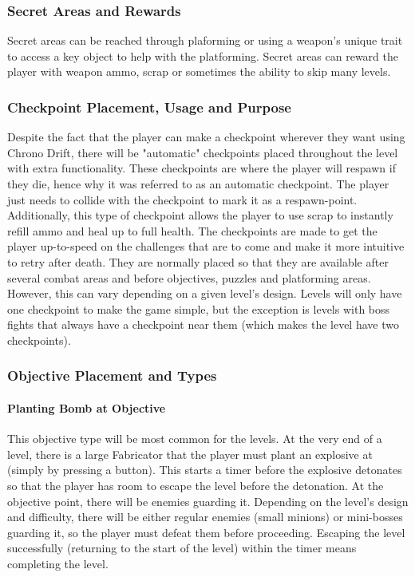 \documentclass[12pt]{article}
\begin{document}
\subsubsection{Secret Areas and Rewards}

Secret areas can be reached through plaforming or using a weapon's unique trait to access a key object to help with the platforming. Secret areas can reward the player with weapon ammo, scrap or sometimes the ability to skip many levels. 


\subsubsection{Checkpoint Placement, Usage and Purpose}

Despite the fact that the player can make a checkpoint wherever they want using Chrono Drift, there will be "automatic" checkpoints placed throughout the level with extra functionality. These checkpoints are where the player will respawn if they die, hence why it was referred to as an automatic checkpoint. The player just needs to collide with the checkpoint to mark it as a respawn-point. Additionally, this type of checkpoint allows the player to use scrap to instantly refill ammo and heal up to full health. The checkpoints are made to get the player up-to-speed on the challenges that are to come and make it more intuitive to retry after death. They are normally placed so that they are available after several combat areas and before objectives, puzzles and platforming areas. However, this can vary depending on a given level's design. Levels will only have one checkpoint to make the game simple, but the exception is levels with boss fights that always have a checkpoint near them (which makes the level have two checkpoints). 

\subsubsection{Objective Placement and Types}

\paragraph{Planting Bomb at Objective}

This objective type will be most common for the levels. At the very end of a level, there is a large Fabricator that the player must plant an explosive at (simply by pressing a button). This starts a timer before the explosive detonates so that the player has room to escape the level before the detonation. At the objective point, there will be enemies guarding it. Depending on the level's design and difficulty, there will be either regular enemies (small minions) or mini-bosses guarding it, so the player must defeat them before proceeding. Escaping the level successfully (returning to the start of the level) within the timer means completing the level. 
\end{document}
